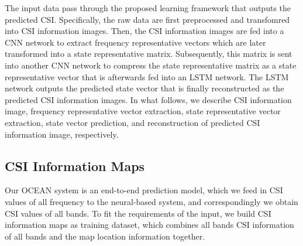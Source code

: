 \documentclass[10pt,conference,letterpaper]{IEEEtran}
\begin{document}
The input data pass through the proposed learning framework that outputs the predicted CSI. Specifically, the raw data are first preprocessed and transfomred into CSI information images. Then, the CSI information images are fed into a CNN network to extract frequency representative vectors which are later transformed into a state representative matrix. Subsequently, this matrix is sent into another CNN network to compress the state representative matrix as a state representative vector that is afterwards fed into an LSTM network. The LSTM network outputs the predicted state vector that is finally reconstructed as the predicted CSI information images. In what follows, we describe CSI information image, frequency representative vector extraction, state representative vector extraction, state vector prediction, and reconstruction of predicted CSI information image, respectively.

\subsection{CSI Information Maps}
Our OCEAN system is an end-to-end prediction model, which we feed in CSI values of all frequency to the neural-based system, and correspondingly we obtain CSI values of all bands. To fit the requirements of the input, we build CSI information maps as training dataset, which combines all bands CSI information of all bands and the map location information together.
\end{document}
